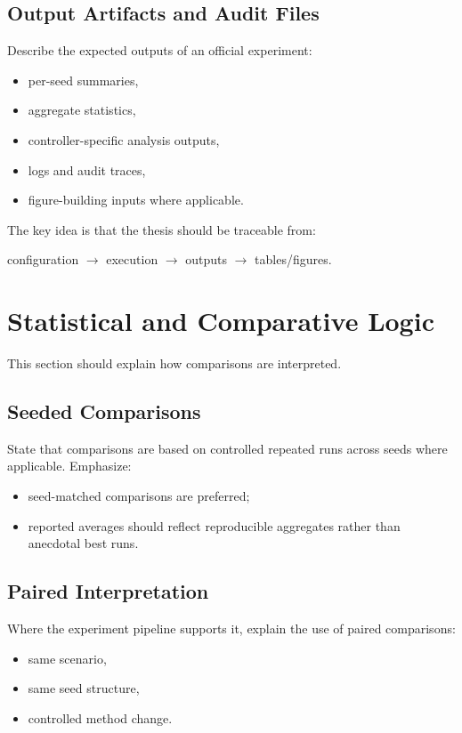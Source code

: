 \subsection{Output Artifacts and Audit Files}

Describe the expected outputs of an official experiment:
\begin{itemize}
    \item per-seed summaries,
    \item aggregate statistics,
    \item controller-specific analysis outputs,
    \item logs and audit traces,
    \item figure-building inputs where applicable.
\end{itemize}

The key idea is that the thesis should be traceable from:
\begin{center}
configuration $\rightarrow$ execution $\rightarrow$ outputs $\rightarrow$ tables/figures.
\end{center}

\section{Statistical and Comparative Logic}

This section should explain how comparisons are interpreted.

\subsection{Seeded Comparisons}

State that comparisons are based on controlled repeated runs across seeds where applicable. Emphasize:
\begin{itemize}
    \item seed-matched comparisons are preferred;
    \item reported averages should reflect reproducible aggregates rather than anecdotal best runs.
\end{itemize}

\subsection{Paired Interpretation}

Where the experiment pipeline supports it, explain the use of paired comparisons:
\begin{itemize}
    \item same scenario,
    \item same seed structure,
    \item controlled method change.
\end{itemize}

